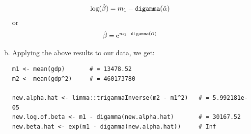 \documentclass[12pt]{article}
\begin{document}
\begin{enumerate}[(a)]
\begin{align*}
\log(\hat\beta)= m_1 - \text{\texttt{digamma}}(\hat\alpha) \\
\end{align*}
or
\begin{align*}
\hat\beta = \mathrm{e}^{m_1 - \text{\texttt{digamma}}(\hat\alpha) }
\end{align*}

\item Applying the above results to our data, we get:

\begin{verbatim}
m1 <- mean(gdp)       # = 13478.52
m2 <- mean(gdp^2)     # = 460173780

new.alpha.hat <- limma::trigammaInverse(m2 - m1^2)   # = 5.992181e-05
new.log.of.beta <- m1 - digamma(new.alpha.hat)       # = 30167.52
new.beta.hat <- exp(m1 - digamma(new.alpha.hat))     # Inf
\end{verbatim}

\end{enumerate}

 
\end{document}
